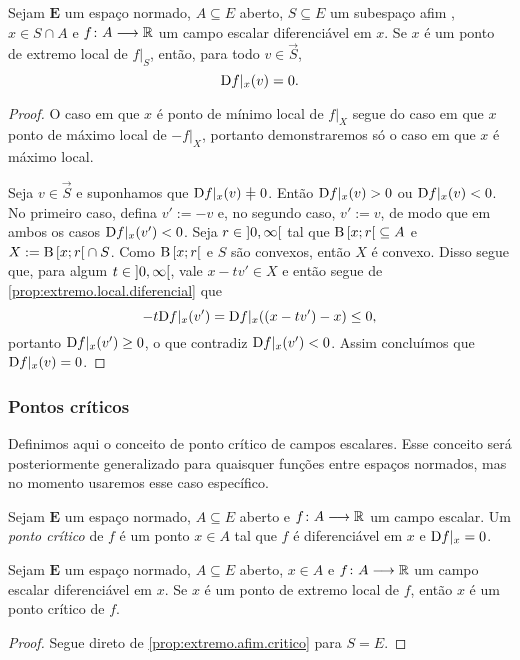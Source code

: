 \begin{proposition}
\label{prop:extremo.afim.critico}
Sejam $\bm E$ um espaço normado, $A \subseteq E$ aberto, $S \subseteq E$ um subespaço afim%
, $x \in S \cap A$ e ${f}\colon {A} \longrightarrow {\mathbb{R}}$ um campo escalar diferenciável em $x$. Se $x$ é um ponto de extremo local de $f|_S$, então, para todo $v \in \vec{S}$,
	\begin{equation*}
	\mathrm{D} f|_x(v) = 0.
	\end{equation*}
\end{proposition}
\begin{proof}
O caso em que $x$ é ponto de mínimo local de $f|_X$ segue do caso em que $x$ ponto de máximo local de $-f|_X$, portanto demonstraremos só o caso em que $x$ é máximo local.

Seja $v \in \vec{S}$ e suponhamos que $\D f|_x(v) \neq 0$. Então $\mathrm{D} f|_x(v) > 0$ ou $\mathrm{D} f|_x(v) < 0$. No primeiro caso, defina $v':=-v$ e, no segundo caso, $v':=v$, de modo que em ambos os casos $\mathrm{D} f|_x(v') < 0$. Seja $r \in \left]{0},{\infty}\right[$ tal que $\mathrm{B}\left[{x};{r}\right[ \subseteq A$ e $X := \mathrm{B}\left[{x};{r}\right[ \cap S$. Como $\mathrm{B}\left[{x};{r}\right[$ e $S$ são convexos, então $X$ é convexo. Disso segue que, para algum $t \in \left]{0},{\infty}\right[$, vale $x-tv' \in X$ e então segue de \ref{prop:extremo.local.diferencial} que
	\begin{equation*}
	-t\mathrm{D} f|_x(v') = \mathrm{D} f|_x((x-tv') - x) \leq 0,
	\end{equation*}
portanto $\mathrm{D} f|_x(v') \geq 0$, o que contradiz $\mathrm{D} f|_x(v') < 0$. Assim concluímos que $\mathrm{D} f|_x (v) = 0$.
\end{proof}

\subsubsection{Pontos críticos}

Definimos aqui o conceito de ponto crítico de campos escalares. Esse conceito será posteriormente generalizado para quaisquer funções entre espaços normados, mas no momento usaremos esse caso específico.

\begin{definition}
Sejam $\bm E$ um espaço normado, $A \subseteq E$ aberto e ${f}\colon {A} \longrightarrow {\mathbb{R}}$ um campo escalar. Um \emph{ponto crítico} de $f$ é um ponto $x \in A$ tal que $f$ é diferenciável em $x$ e $\mathrm{D} f|_x = 0$.
\end{definition}

\begin{proposition}
\label{prop:extremo.critico}
Sejam $\bm E$ um espaço normado, $A \subseteq E$ aberto, $x \in A$ e ${f}\colon {A} \longrightarrow {\mathbb{R}}$ um campo escalar diferenciável em $x$. Se $x$ é um ponto de extremo local de $f$, então $x$ é um ponto crítico de $f$.
\end{proposition}
\begin{proof}
Segue direto de \ref{prop:extremo.afim.critico} para $S = E$.
\end{proof}

